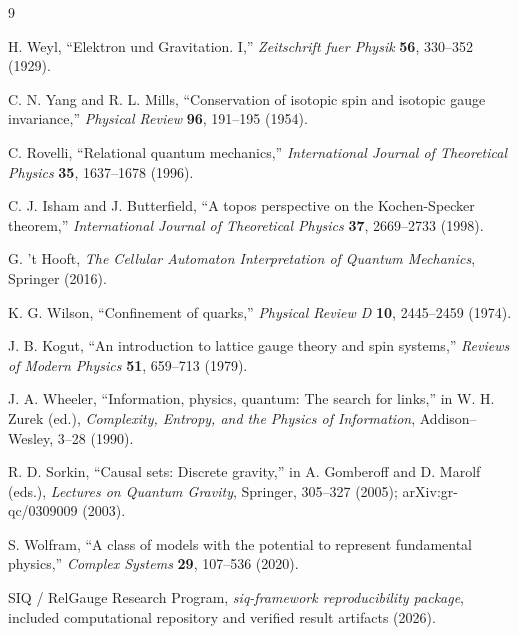 \documentclass[11pt]{article}
\begin{document}
\begin{thebibliography}{9}

H. Weyl, ``Elektron und Gravitation. I,'' \emph{Zeitschrift fuer Physik} \textbf{56}, 330--352 (1929).

C. N. Yang and R. L. Mills, ``Conservation of isotopic spin and isotopic gauge invariance,'' \emph{Physical Review} \textbf{96}, 191--195 (1954).

C. Rovelli, ``Relational quantum mechanics,'' \emph{International Journal of Theoretical Physics} \textbf{35}, 1637--1678 (1996).

C. J. Isham and J. Butterfield, ``A topos perspective on the Kochen-Specker theorem,'' \emph{International Journal of Theoretical Physics} \textbf{37}, 2669--2733 (1998).

G. 't Hooft, \emph{The Cellular Automaton Interpretation of Quantum Mechanics}, Springer (2016).

K. G. Wilson, ``Confinement of quarks,'' \emph{Physical Review D} \textbf{10}, 2445--2459 (1974).

J. B. Kogut, ``An introduction to lattice gauge theory and spin systems,'' \emph{Reviews of Modern Physics} \textbf{51}, 659--713 (1979).

J. A. Wheeler, ``Information, physics, quantum: The search for links,'' in W. H. Zurek (ed.), \emph{Complexity, Entropy, and the Physics of Information}, Addison--Wesley, 3--28 (1990).

R. D. Sorkin, ``Causal sets: Discrete gravity,'' in A. Gomberoff and D. Marolf (eds.), \emph{Lectures on Quantum Gravity}, Springer, 305--327 (2005); arXiv:gr-qc/0309009 (2003).

S. Wolfram, ``A class of models with the potential to represent fundamental physics,'' \emph{Complex Systems} \textbf{29}, 107--536 (2020).

SIQ / RelGauge Research Program, \emph{siq-framework reproducibility package}, included computational repository and verified result artifacts (2026).

\end{thebibliography}
\end{document}
